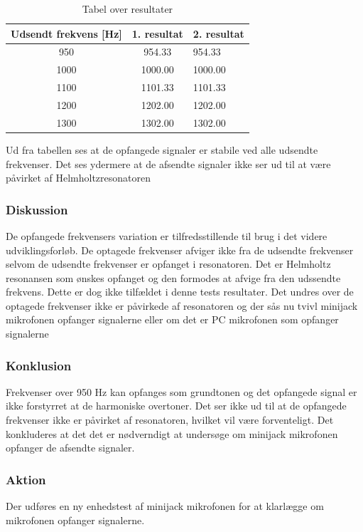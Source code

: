 			\begin{table}[]
				\centering
				\caption{Tabel over resultater}
				\label{bordtest5resultater}
				\begin{tabular}{lll}
					\multicolumn{1}{l|}{\textbf{Udsendt frekvens {[}Hz{]}}} & 	
					\multicolumn{1}{l|}{\textbf{1. resultat}} & \textbf{2. resultat} \\ \hline
					\multicolumn{1}{c|}{950}& 
					\multicolumn{1}{c|}{954.33}&954.33\\
					\multicolumn{1}{c|}{1000}& 
					\multicolumn{1}{c|}{1000.00}&1000.00\\
					\multicolumn{1}{c|}{1100}& 
					\multicolumn{1}{c|}{1101.33}&1101.33\\
					\multicolumn{1}{c|}{1200}& 
					\multicolumn{1}{c|}{1202.00}&1202.00\\
					\multicolumn{1}{c|}{1300}& 
					\multicolumn{1}{c|}{1302.00}&1302.00\\
                   
				\end{tabular}
			\end{table}
			
			Ud fra tabellen ses at de opfangede signaler er stabile ved alle udsendte frekvenser. Det ses ydermere at de afsendte signaler ikke ser ud til at være påvirket af Helmholtzresonatoren
				
			  
			\subsubsection{Diskussion}
			De opfangede frekvensers variation er tilfredsstillende til brug i det videre udviklingsforløb. De optagede frekvenser afviger ikke fra de udsendte frekvenser selvom de udsendte frekvenser er opfanget i resonatoren. Det er Helmholtz resonansen som ønskes opfanget og den formodes at afvige fra den udssendte frekvens. Dette er dog ikke tilfældet i denne tests resultater. Det undres over de optagede frekvenser ikke er påvirkede af resonatoren og der sås nu tvivl minijack mikrofonen opfanger signalerne eller om det er PC mikrofonen som opfanger signalerne
			
			\subsubsection{Konklusion}
			Frekvenser over 950 Hz kan opfanges som grundtonen og det opfangede signal er ikke forstyrret at de harmoniske overtoner. Det ser ikke ud til at de opfangede frekvenser ikke er påvirket af resonatoren, hvilket vil være forventeligt. Det konkluderes at det det er nødverndigt at undersøge om minijack mikrofonen opfanger de afsendte signaler. 
			
			\subsubsection{Aktion}
			 Der udføres en ny enhedstest af minijack mikrofonen for at klarlægge om mikrofonen opfanger signalerne. 
			


		
	
	
	

	